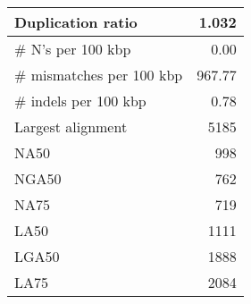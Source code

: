 \documentclass[12pt,a4paper]{article}
\begin{document}
\begin{table}[ht]
\begin{center}
\begin{tabular}{|l*{1}{|r}|}
Duplication ratio & 1.032 \\ \hline
\# N's per 100 kbp & 0.00 \\ \hline
\# mismatches per 100 kbp & 967.77 \\ \hline
\# indels per 100 kbp & 0.78 \\ \hline
Largest alignment & 5185 \\ \hline
NA50 & 998 \\ \hline
NGA50 & 762 \\ \hline
NA75 & 719 \\ \hline
LA50 & 1111 \\ \hline
LGA50 & 1888 \\ \hline
LA75 & 2084 \\ \hline
\end{tabular}
\end{center}
\end{table}
\end{document}
